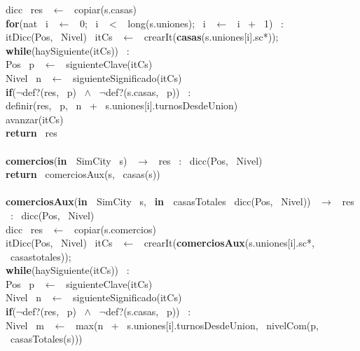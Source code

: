 \begin{Algoritmos}
\indent dicc \ res \ $\leftarrow$ \ copiar(s.casas)\\
\indent \textbf{for}(nat \ i \ $\leftarrow$ \ 0; \ i \ $<$ \ long(s.uniones); \ i \ $\leftarrow$ \ i \ + \ 1) \ : \ \\
\indent \indent itDicc(Pos, \ Nivel) \ itCs \ $\leftarrow$ \ crearIt(\textbf{casas}(s.uniones[i].sc*));\\
\indent \indent \textbf{while}(haySiguiente(itCs)) \ :\\
\indent \indent \indent Pos \ p \ $\leftarrow$ \ siguienteClave(itCs)\\
\indent \indent \indent Nivel \ n \ $\leftarrow$ \ siguienteSignificado(itCs)\\
\indent \indent \indent \textbf{if}($\neg$def?(res, \ p) \ $\wedge$ \ $\neg$def?(s.casas, \ p)) \ :\\
\indent \indent \indent \indent definir(res, \ p, \ n \ + \ s.uniones[i].turnosDesdeUnion)\\
\indent \indent \indent avanzar(itCs)\\
\indent \textbf{return} \ res\\
\noindent\makebox[\linewidth]{\rule{\textwidth}{0.4pt}}
\\
\noindent\makebox[\linewidth]{\rule{\textwidth}{0.4pt}}
\textbf{comercios}(\textbf{in \ }SimCity \ s) \ $\rightarrow $ \ res \ : \ dicc(Pos, \ Nivel)\\
\indent \textbf{return} \ comerciosAux(s, \ casas(s))\\
\\
\textbf{comerciosAux}(\textbf{in \ }SimCity \ s, \ \textbf{in \ }casasTotales \ dicc(Pos, \ Nivel)) \ $\rightarrow $ \ res \ : \ dicc(Pos, \ Nivel)\\
\indent dicc \ res \ $\leftarrow$ \ copiar(s.comercios)\\
\indent itDicc(Pos, \ Nivel) \ itCs \ $\leftarrow$ \ crearIt(\textbf{comerciosAux}(s.uniones[i].sc*, \ casastotales));\\
\indent \textbf{while}(haySiguiente(itCs)) \ :\\
\indent \indent Pos \ p \ $\leftarrow$ \ siguienteClave(itCs)\\
\indent \indent Nivel \ n \ $\leftarrow$ \ siguienteSignificado(itCs)\\
\indent \indent \textbf{if}($\neg$def?(res, \ p) \ $\wedge$ \ $\neg$def?(s.casas, \ p)) \ :\\
\indent \indent \indent Nivel \ m \ $\leftarrow$ \ max(n \ + \ s.uniones[i].turnosDesdeUnion, \ nivelCom(p, \ casasTotales(s)))\\

\end{Algoritmos}
